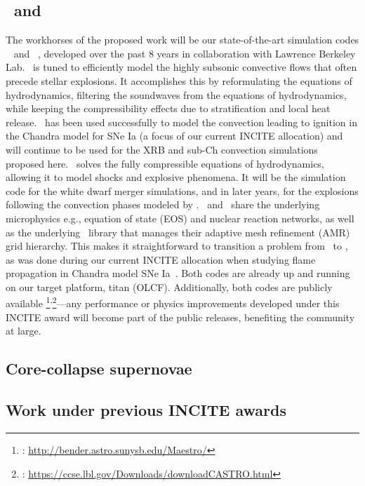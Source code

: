 \documentclass[11pt,letterpaper,english]{article}
\newcommand\fnsep{\textsuperscript{,}}
\begin{document}
\subsection{\maestro\ and \castro}

The workhorses of the proposed work will be our state-of-the-art
simulation codes \maestro~\cite{multilevel} and
\castro~\cite{castro:I}, developed over the past 8 years in
collaboration with Lawrence Berkeley Lab.  \maestro\ is tuned to
efficiently model the highly subsonic convective flows that often
precede stellar explosions.  It accomplishes this by reformulating
the equations of hydrodynamics, filtering the
soundwaves from the equations of hydrodynamics, while keeping 
the compressibility effects due to stratification and local heat release.
\maestro\ has been used successfully to model the convection leading
to ignition in the Chandra model for SNe Ia (a focus of our current
INCITE allocation) and will continue to be used for the XRB and sub-Ch
convection simulations proposed here.  \castro\ solves the fully
compressible equations of hydrodynamics, allowing it to model shocks
and explosive phenomena.  It will be the simulation code for the white
dwarf merger simulations, and in later years, for the explosions
following the convection phases modeled by \maestro.  \maestro\ and
\castro\ share the underlying microphysics e.g., equation of state
(EOS) and nuclear reaction networks, as well as the underlying
\boxlib\ library that manages their adaptive mesh refinement (AMR)
grid hierarchy.  This makes it straightforward to transition a problem
from \maestro\ to \castro, as was done during our current INCITE
allocation when studying flame propagation in Chandra model SNe
Ia~\cite{Mal14}.  Both codes are already up and running on our target
platform, titan (OLCF).  Additionally, both codes are publicly
available%
\footnote{\maestro: \url{http://bender.astro.sunysb.edu/Maestro/}}\fnsep\footnote{\castro: \url{https://ccse.lbl.gov/Downloads/downloadCASTRO.html}}---any
performance or physics improvements developed under this INCITE award
will become part of the public releases, benefiting the community
at large.


\subsection{Core-collapse supernovae}



\subsection{Work under previous INCITE awards}
\end{document}
